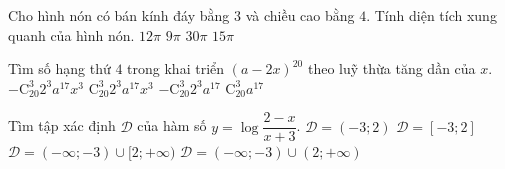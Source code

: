 \begin{ex}%
Cho hình nón có bán kính đáy bằng $3$ và chiều cao bằng $4$. Tính diện tích xung quanh của hình nón.
\choice
{$12\pi$}
{$9\pi$}
{$30\pi$}
{\True $15\pi$}
\end{ex}

\begin{ex}%
Tìm số hạng thứ $4$ trong khai triển $\left( a-2x \right)^{20}$ theo luỹ thừa tăng dần của $x$.
\choice
{\True $-\mathrm{C}^3_{20}2^3a^{17}x^3$}
{$\mathrm{C}^3_{20}2^3a^{17}x^3$}
{$-\mathrm{C}^3_{20}2^3a^{17}$}
{$\mathrm{C}^3_{20}a^{17}$}
\end{ex}

\begin{ex}%
Tìm tập xác định $\mathscr{D}$ của hàm số $y=\log \dfrac{2-x}{x+3}$.
\choice
{\True $\mathscr{D}=(-3;2)$}
{$\mathscr{D}=[-3;2]$}
{$\mathscr{D}=(-\infty;-3)\cup [2;+\infty)$}
{$\mathscr{D}=(-\infty;-3)\cup (2;+\infty)$}
\end{ex}


